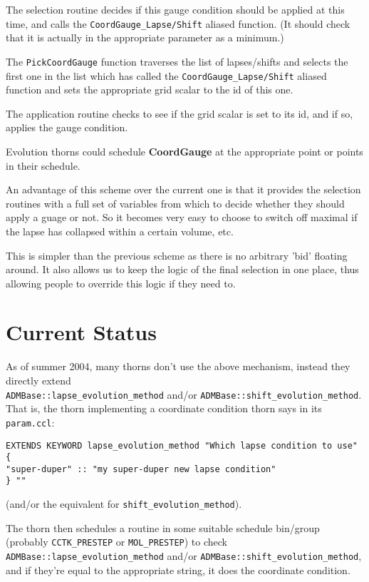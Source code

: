 \documentclass{article}
\begin{document}
The selection routine decides if this gauge condition should be applied at
this time, and calls the \verb|CoordGauge_Lapse/Shift| aliased function.
(It should check that it is actually in the appropriate parameter as a
minimum.)

The \verb|PickCoordGauge| function traverses the list of lapses/shifts
and selects the first one in the list which has called the
\verb|CoordGauge_Lapse/Shift| aliased function and sets the
appropriate grid scalar to the id of this one.

The application routine checks to see if the grid scalar is set to its id,
and if so, applies the gauge condition.

Evolution thorns could schedule {\bf CoordGauge} at the appropriate point or
points in their schedule.

An advantage of this scheme over the current one is that it provides the
selection routines with a full set of variables from which to decide
whether they should apply a guage or not.  So it becomes very easy to
choose to switch off maximal if the lapse has collapsed within a certain
volume, etc.

This is simpler than the previous scheme as there is no arbitrary 'bid'
floating around.  It also allows us to keep the logic of the final
selection in one place, thus allowing people to override this logic if
they need to.


\section{Current Status}

As of summer 2004, many thorns don't use the above mechanism, instead
they directly extend \\
\verb|ADMBase::lapse_evolution_method| and/or
\verb|ADMBase::shift_evolution_method|.  That is, the thorn implementing
a coordinate condition thorn says in its \verb|param.ccl|:
\begin{verbatim}
EXTENDS KEYWORD lapse_evolution_method "Which lapse condition to use"
{
"super-duper" :: "my super-duper new lapse condition"
} ""
\end{verbatim}
(and/or the equivalent for \verb|shift_evolution_method|).

The thorn then schedules a routine in some suitable schedule bin/group
(probably \verb|CCTK_PRESTEP| or \verb|MOL_PRESTEP|) to check
\verb|ADMBase::lapse_evolution_method| and/or
\verb|ADMBase::shift_evolution_method|, and if they're equal
to the appropriate string, it does the coordinate condition.
\end{document}
